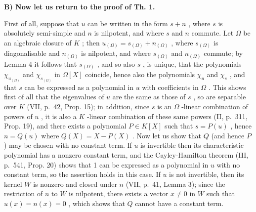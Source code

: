 \textbf{B) Now let us return to the proof of Th. 1.}\par

First of all, suppose that \(u\) can be written in the form \(s + n\) , where \(s\) is absolutely semi-simple and \(n\) is nilpotent, and where \(s\) and \(n\) commute. Let \(\Omega\) be an algebraic closure of \(K\) ; then \(u_{(\Omega)} = s_{(\Omega)} + n_{(\Omega)}\) , where \(s_{(\Omega)}\) is diagonalisable and \(n_{(\Omega)}\) is nilpotent, and where \(s_{(\Omega)}\) and \(n_{(\Omega)}\) commute; by Lemma 4 it follows that \(s_{(\Omega)}\) , and so also \(s\) , is unique, that the polynomials \(\chi_{u_{(\Omega)}}\) and \(\chi_{s_{(\Omega)}}\) in \(\Omega[X]\) coincide, hence also the polynomials \(\chi_u\) and \(\chi_s\) , and that \(s\) can be expressed as a polynomial in \(u\) with coefficients in \(\Omega\) . This shows first of all that the eigenvalues of \(u\) are the same as those of \(s\) , so are separable over \(K\) (VII, p.~42, Prop. 15); in addition, since \(s\) is an \(\Omega\) -linear combination of powers of \(u\) , it is also a \(K\) -linear combination of these same powers (II, p.~311, Prop. 19), and there exists a polynomial \(P \in K[X]\) such that \(s = P(u)\) , hence \(n = Q(u)\) where \(Q(X) = X - P(X)\) . Now let us show that \(Q\) (and hence \(P\) ) may be chosen with no constant term. If \(u\) is invertible then its characteristic polynomial has a nonzero constant term, and the Cayley-Hamilton theorem (III, p.~541, Prop. 20) shows that 1 can be expressed as a polynomial in \(u\) with no constant term, so the assertion holds in this case. If \(u\) is not invertible, then its kernel \(W\) is nonzero and closed under \(n\) (VII, p.~41, Lemma 3); since the restriction of \(n\) to \(W\) is nilpotent, there exists a vector \(x \neq 0\) in \(W\) such that \(u(x) = n(x) = 0\) , which shows that \(Q\) cannot have a constant term.

